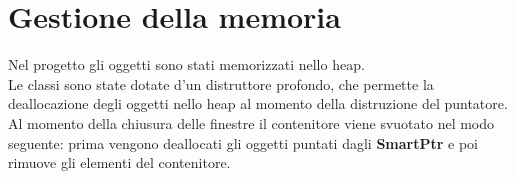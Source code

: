 \section{Gestione della memoria}{
	Nel progetto \textbf{\ggt} gli oggetti sono stati memorizzati nello heap. \\
	Le classi sono state dotate d'un distruttore profondo, che permette la deallocazione degli oggetti nello heap al momento della distruzione del puntatore. \\
	Al momento della chiusura delle finestre il contenitore viene svuotato nel modo seguente: prima vengono deallocati gli oggetti puntati dagli \textbf{SmartPtr} e poi rimuove gli elementi del contenitore.
}